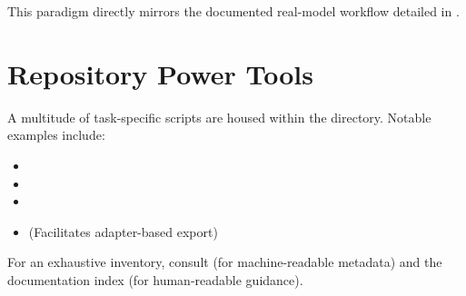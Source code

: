 \noindent This paradigm directly mirrors the documented real-model workflow detailed in .

\section{Repository Power Tools}
A multitude of task-specific scripts are housed within the  directory. Notable examples include:
\begin{itemize}
  \item {}
  \item {}
  \item {}
  \item {} (Facilitates adapter-based export)
\end{itemize}

For an exhaustive inventory, consult  (for machine-readable metadata) and the documentation index (for human-readable guidance).
